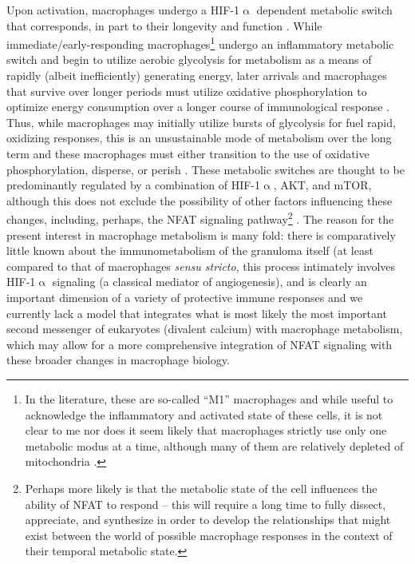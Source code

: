 Upon activation, macrophages undergo a HIF-1$\upalpha$ dependent metabolic switch that corresponds, in part to their longevity and function \citep{Kolliniati2022}. While immediate/early-responding macrophages\footnote{In the literature, these are so-called ``M1'' macrophages and while useful to acknowledge the inflammatory and activated state of these cells, it is not clear to me nor does it seem likely that macrophages strictly use only one metabolic modus at a time, although many of them are relatively depleted of mitochondria \citep{Biswas2012}.} undergo an inflammatory metabolic switch and begin to utilize aerobic glycolysis for metabolism as a means of rapidly (albeit inefficiently) generating energy, later arrivals and macrophages that survive over longer periods must utilize oxidative phosphorylation to optimize energy consumption over a longer course of immunological response \citep{Shi2019, Kiran2016, Viola2019, Langston2017, Taylor2022}. Thus, while macrophages may initially utilize  bursts of glycolysis for fuel rapid, oxidizing responses, this is an unsustainable mode of metabolism over the long term and these macrophages must either transition to the use of oxidative phosphorylation, disperse, or perish \citep{Odegaard2011, Howard2020}. These metabolic switches are thought to be predominantly regulated by a combination of HIF-1$\upalpha$, AKT, and mTOR, although this does not exclude the possibility of other factors influencing these changes, including, perhaps, the NFAT signaling pathway\footnote{Perhaps more likely is that the metabolic state of the cell influences the ability of NFAT to respond -- this will require a long time to fully dissect, appreciate, and synthesize in order to develop the relationships that might exist between the world of possible macrophage responses in the context of their temporal metabolic state.} \citep{Covarrubias2015, Karar2011}. The reason for the present interest in macrophage metabolism is many fold: there is comparatively little known about the immunometabolism of the granuloma itself (at least compared to that of macrophages \textit{sensu stricto}, this process intimately involves HIF-1$\upalpha$ signaling (a classical mediator of angiogenesis), and is clearly an important dimension of a variety of protective immune responses and we currently lack a model that integrates what is most likely the most important second messenger of eukaryotes (divalent calcium) with macrophage metabolism, which may allow for a more comprehensive integration of NFAT signaling with these broader changes in macrophage biology. 

